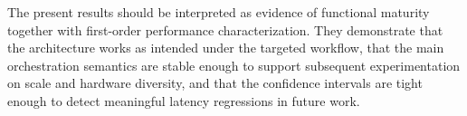 The present results should be interpreted as evidence of functional maturity together with first-order performance characterization. They demonstrate that the architecture works as intended under the targeted workflow, that the main orchestration semantics are stable enough to support subsequent experimentation on scale and hardware diversity, and that the confidence intervals are tight enough to detect meaningful latency regressions in future work.
